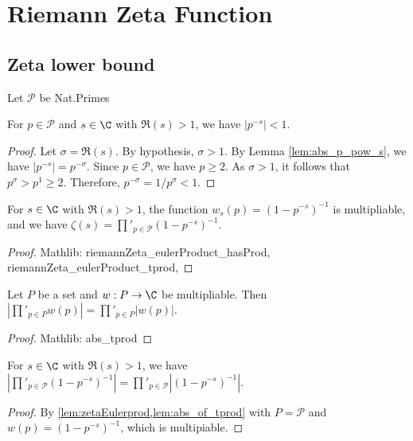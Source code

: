 \chapter{Riemann Zeta Function}\label{riemann_zeta}

\section{Zeta lower bound}

\begin{definition} \label{def:NatPrimes} \leanok
Let $\mathcal{P}$ be Nat.Primes
\end{definition}

\begin{lemma}\label{lem:p_s_abs_1} 
\leanok
{}
For $p\in\mathcal{P}$ and $s\in\C$ with $\Re(s)>1$, we have $|p^{-s}|<1$.
\end{lemma}
\begin{proof}
\leanok
{}
Let $\sigma = \Re(s)$. By hypothesis, $\sigma > 1$.
By Lemma \ref{lem:abs_p_pow_s}, we have $|p^{-s}| = p^{-\sigma}$.
Since $p\in\mathcal{P}$, we have $p\ge 2$. As $\sigma>1$, it follows that $p^\sigma > p^1 \ge 2$.
Therefore, $p^{-\sigma} = 1/p^\sigma < 1$.
\end{proof}

\begin{lemma}\label{lem:zetaEulerprod} 
\leanok
{}
For $s\in\C$ with $\Re(s)>1$, the function $w_s(p)=(1-p^{-s})^{-1}$ is multipliable, and we have $\zeta(s) = \prod'_{p\in\mathcal{P}}(1-p^{-s})^{-1}$.
\end{lemma}
\begin{proof}
\leanok
Mathlib: riemannZeta\_eulerProduct\_hasProd, riemannZeta\_eulerProduct\_tprod,
\end{proof}


\begin{lemma}\label{lem:abs_of_tprod} 
\leanok
Let $P$ be a set and $w:P\to\C$ be multipliable. Then $|\prod'_{p\in P} w(p)| = \prod'_{p \in P} |w(p)|$.
\end{lemma}
\begin{proof}
\leanok
Mathlib: abs\_tprod
\end{proof}

\begin{lemma}\label{lem:abs_P_prod} 
\leanok
{}
For $s\in\C$ with $\Re(s)>1$, we have $|\prod'_{p\in\mathcal{P}}(1-p^{-s})^{-1}| = \prod'_{p\in\mathcal{P}}|(1-p^{-s})^{-1}|$.
\end{lemma}
\begin{proof}
\leanok
{}
By \cref{lem:zetaEulerprod,lem:abs_of_tprod} with $P=\mathcal{P}$ and
$w(p) = (1-p^{-s})^{-1}$, which is multipiable.
\end{proof}

